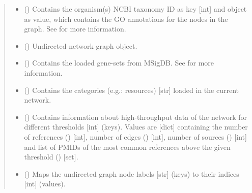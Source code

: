 \documentclass[letterpaper,10pt,english]{sphinxmanual}
\begin{document}
\begin{fulllineitems}
\begin{quote}
\begin{description}
\begin{itemize}
\item {} 
 () \textendash{} Contains the organism(s) NCBI taxonomy ID as key {[}int{]} and
 object as value, which
contains the GO annotations for the nodes in the graph. See
 for more information.

\item {} 
 () \textendash{} Undirected network graph object.

\item {} 
 () \textendash{} Contains the loaded gene-sets from MSigDB. See
 for more information.

\item {} 
 () \textendash{} Contains the categories (e.g.: resources) {[}str{]} loaded in the
current network.

\item {} 
 () \textendash{} Contains information about high-throughput data of the network
for different thresholds {[}int{]} (keys). Values are {[}dict{]}
containing the number of references () {[}int{]}, number
of edges () {[}int{]}, number of sources ()
{[}int{]} and list of PMIDs of the most common references above the
given threshold () {[}set{]}.

\item {} 
 () \textendash{} Maps the undirected graph node labels {[}str{]} (keys) to their
indices {[}int{]} (values).


\end{itemize}
\end{description}
\end{quote}
\end{fulllineitems}
\end{document}
